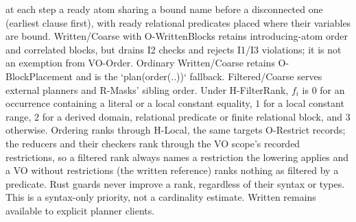 at each step a ready atom sharing a bound name before a disconnected
one (earliest clause first), with ready relational predicates placed where
their variables are bound. Written/Coarse with O-WrittenBlocks retains
introducing-atom order and correlated blocks, but drains I2 checks and rejects
I1/I3 violations; it is not an exemption from VO-Order. Ordinary Written/Coarse
retains O-BlockPlacement and is the `plan(order(..))` fallback. Filtered/Coarse serves external planners
and R-Masks' sibling order. Under H-FilterRank, $f_i$ is
$0$ for an occurrence containing a literal or a local constant equality, $1$ for a local constant range,
$2$ for a derived domain, relational predicate or finite relational block,
and $3$ otherwise. Ordering ranks through H-Local, the same targets O-Restrict
records; the reducers and their checkers rank through the VO scope's recorded
restrictions, so a filtered rank always names a restriction the lowering
applies and a VO without restrictions (the written reference) ranks nothing as
filtered by a predicate.
Rust guards never
improve a rank, regardless of their syntax or types. This is a syntax-only priority, not a cardinality
estimate. Written remains available to explicit planner clients.


